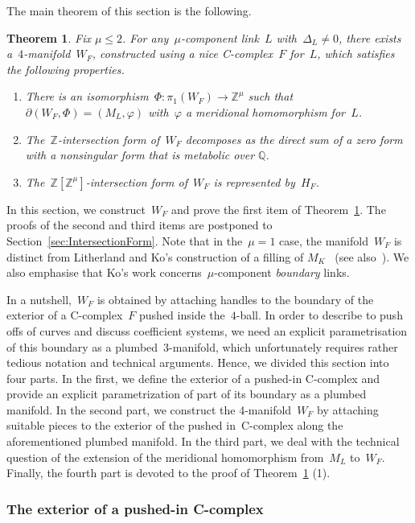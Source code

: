 \documentclass[10.9pt,a4paper]{amsart}
\newtheorem{theorem}{Theorem}[section]
\theoremstyle{definition}
\theoremstyle{remark}
\newcommand{\Z}{\mathbb{Z}}
\newcommand{\Q}{\mathbb{Q}}
\begin{document}
The main theorem of this section is the following.
\begin{theorem}
\label{thm:ExistenceOfW}
Fix $\mu \leq 2$.
For any~$\mu$-component link~$L$ with~$\Delta_L \neq 0$, there exists a~$4$-manifold~$W_F$, constructed
using a nice C-complex~$F$ for~$L$, which satisfies the following properties.
\begin{enumerate}
\item There is an isomorphism~$\Phi\colon \pi_1(W_F) \to \Z^\mu$ such that~$\partial(W_F,\Phi)=(M_L,\varphi)$
with~$\varphi$ a meridional homomorphism for~$L$.
\item The~$\Z$-intersection form of~$W_F$ decomposes as the direct sum of a zero form with a nonsingular form that is metabolic over $\Q$.
\item The~$\Z[\Z^\mu]$-intersection form of~$W_F$ is represented by~$H_F$.
\end{enumerate}
\end{theorem}


In this section, we construct~$W_F$ and prove the first item of Theorem~\ref{thm:ExistenceOfW}.
The proofs of the second and third items are postponed to Section~\ref{sec:IntersectionForm}.
Note that in the~$\mu=1$ case, the manifold~$W_F$ 
is distinct from Litherland and Ko's construction of a filling of $M_K$~\cite{LitherlandCobordism,Ko2} (see also~\cite{FL26}).
We also emphasise that Ko's work concerns~$\mu$-component \emph{boundary} links.



In a nutshell,~$W_F$ is obtained by attaching handles to the boundary of the exterior of a C-complex~$F$ pushed inside the~$4$-ball.
In order to describe to push offs of curves and discuss coefficient systems, 
we need an explicit parametrisation of this boundary as a plumbed~$3$-manifold,
which unfortunately requires rather tedious notation and technical arguments.
Hence, we divided this section into four parts. In the first, we define the exterior of a pushed-in C-complex and provide an explicit parametrization of part of its boundary as a plumbed manifold. In the second part, we construct the 4-manifold~$W_F$ by attaching suitable pieces to the exterior of the pushed in~C-complex along the aforementioned plumbed manifold. In the third part, we deal with the technical question of the extension of the meridional homomorphism
from~$M_L$ to~$W_F$.
Finally, the fourth part is devoted to the proof of Theorem~\ref{thm:ExistenceOfW} (1).

\subsubsection*{The exterior of a pushed-in C-complex}
\end{document}
